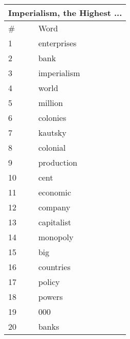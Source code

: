 \documentclass{pnastwo}
\begin{document}
\begin{article}
\begin{center}
  \begin{tabular}{ | l | l | }
    \hline
    \multicolumn{2}{|c|}{Imperialism, the Highest ...} \\ \hline
    \# & Word  \\ \hline
1 & enterprises \\ \hline
2 & bank \\ \hline
3 & imperialism \\ \hline
4 & world \\ \hline
5 & million \\ \hline
6 & colonies \\ \hline
7 & kautsky \\ \hline
8 & colonial \\ \hline
9 & production \\ \hline
10 & cent \\ \hline
11 & economic \\ \hline
12 & company \\ \hline
13 & capitalist \\ \hline
14 & monopoly \\ \hline
15 & big \\ \hline
16 & countries \\ \hline
17 & policy \\ \hline
18 & powers \\ \hline
19 & 000 \\ \hline
20 & banks \\ \hline
  \end{tabular}
\end{center}


\end{article}
\end{document}
